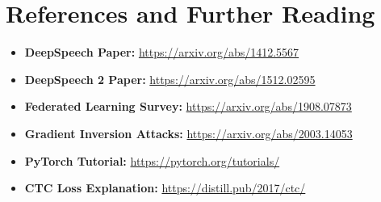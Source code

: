 \documentclass[12pt]{article}
\begin{document}
\section{References and Further Reading}

\begin{itemize}
    \item \textbf{DeepSpeech Paper:} \url{https://arxiv.org/abs/1412.5567}
    \item \textbf{DeepSpeech 2 Paper:} \url{https://arxiv.org/abs/1512.02595}
    \item \textbf{Federated Learning Survey:} \url{https://arxiv.org/abs/1908.07873}
    \item \textbf{Gradient Inversion Attacks:} \url{https://arxiv.org/abs/2003.14053}
    \item \textbf{PyTorch Tutorial:} \url{https://pytorch.org/tutorials/}
    \item \textbf{CTC Loss Explanation:} \url{https://distill.pub/2017/ctc/}
\end{itemize}
\end{document}
